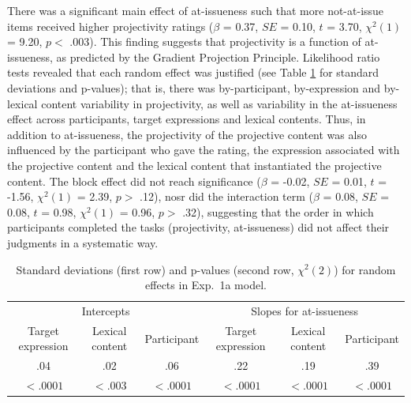 \documentclass[11pt,fleqn]{article}
\newcommand{\6}{\mbox{$[\hspace*{-.6mm}[$}}
\newcommand{\9}{\mbox{$]\hspace*{-.6mm}]$}}
\newcommand{\tableref}[1]{Table \ref{#1}}
\begin{document}
There was a significant main effect of at-issueness such that more not-at-issue items received higher projectivity ratings ($\beta$ = 0.37, $SE$ = 0.10, $t$ = 3.70, $\chi^2(1)$ = 9.20, $p <$ .003). This finding suggests that projectivity is a function of at-issueness, as predicted by the Gradient Projection Principle. Likelihood ratio tests revealed that each random effect was justified (see \tableref{tab:random1a} for standard deviations and p-values); that is, there was by-participant, by-expression and by-lexical content variability in projectivity, as well as variability in the at-issueness effect across participants, target expressions and lexical contents. Thus, in addition to at-issueness, the projectivity of the projective content was also influenced by the participant who gave the rating, the expression associated with the projective content and the lexical content that instantiated the projective content. The block effect did not reach significance ($\beta$ = -0.02, $SE$ = 0.01, $t$ = -1.56, $\chi^2(1)$ = 2.39, $p >$ .12), nosr did the interaction term ($\beta$ = 0.08, $SE$ = 0.08, $t$ = 0.98, $\chi^2(1)$ = 0.96, $p >$ .32), suggesting that the order in which participants completed the tasks (projectivity, at-issueness) did not affect their judgments in a systematic way. 


\begin{table}
\begin{tabular}{c c c c c c }
\toprule
\multicolumn{3}{c}{Intercepts} & \multicolumn{3}{c}{Slopes for at-issueness}\\
Target expression & Lexical content & Participant & Target expression & Lexical content & Participant\\
\midrule
.04 & .02 & .06 & .22 & .19 & .39\\
$< .0001$ & $< .003$ & $< .0001$ & $< .0001$ & $< .0001$ & $< .0001$ \\
\bottomrule
\end{tabular}
\caption{Standard deviations (first row) and p-values (second row, $\chi^2(2)$) for random effects in Exp.~1a model.}\label{tab:random1a}
\end{table}
\end{document}
